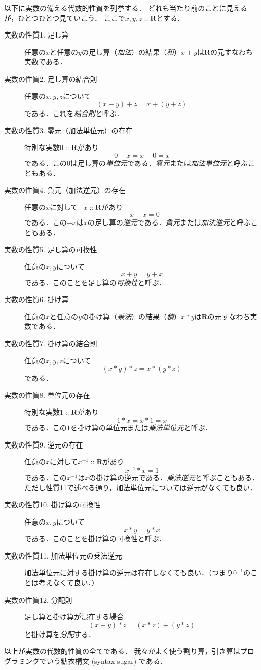 \documentclass[twocolumn]{jsbook}
\DeclareMathOperator{\mathIn}{::}
\newcommand{\mathSet}[1]{\mathbf{#1}}
\newcommand{\keyword}[1]{\emph{#1}}
\begin{document}
以下に実数の備える代数的性質を列挙する．
どれも当たり前のことに見えるが，ひとつひとつ見ていこう．
ここで$x,y,z\mathIn\mathSet{R}$とする．
\begin{description}
\item[実数の性質1. 足し算] 任意の$x$と任意の$y$の足し算（\keyword{加法}）の結果（\keyword{和}）$x+y$は$\mathSet{R}$の元すなわち実数である．
\item[実数の性質2. 足し算の結合則] 任意の$x,y,z$について$$(x+y)+z=x+(y+z)$$である．これを\keyword{結合則}と呼ぶ．
\item[実数の性質3. 零元（加法単位元）の存在] 特別な実数$0\mathIn\mathSet{R}$があり$$0+x=x+0=x$$である．この$0$は足し算の\keyword{単位元}である．\keyword{零元}または\keyword{加法単位元}と呼ぶこともある．
\item[実数の性質4. 負元（加法逆元）の存在] 任意の$x$に対して$-x\mathIn\mathSet{R}$があり$$-x+x=0$$である．この$-x$は$x$の足し算の\keyword{逆元}である．\keyword{負元}または\keyword{加法逆元}と呼ぶこともある．
\item[実数の性質5. 足し算の可換性] 任意の$x,y$について$$x+y=y+x$$である．このことを足し算の\keyword{可換性}と呼ぶ．
\item[実数の性質6. 掛け算] 任意の$x$と任意の$y$の掛け算（\keyword{乗法}）の結果（\keyword{積}）$x*y$は$\mathSet{R}$の元すなわち実数である．
\item[実数の性質7. 掛け算の結合則] 任意の$x,y,z$について$$(x*y)*z=x*(y*z)$$である．
\item[実数の性質8. 単位元の存在] 特別な実数$1\mathIn\mathSet{R}$があり$$1*x=x*1=x$$である．この$1$を掛け算の単位元または\keyword{乗法単位元}と呼ぶ．
\item[実数の性質9. 逆元の存在] 任意の$x$に対して$x^{-1}\mathIn\mathSet{R}$があり$$x^{-1}*x=1$$である．この$x^{-1}$は$x$の掛け算の逆元である．\keyword{乗法逆元}と呼ぶこともある．ただし性質11で述べる通り，加法単位元については逆元がなくても良い．
\item[実数の性質10. 掛け算の可換性] 任意の$x,y$について$$x*y=y*x$$である．このことを掛け算の可換性と呼ぶ．
\item[実数の性質11. 加法単位元の乗法逆元] 加法単位元に対する掛け算の逆元は存在しなくても良い．（つまり$0^{-1}$のことは考えなくて良い．）
\item[実数の性質12. 分配則] 足し算と掛け算が混在する場合$$(x+y)*z=(x*z)+(y*z)$$と掛け算を\keyword{分配}する．
\end{description}
以上が実数の代数的性質の全てである．
我々がよく使う割り算，引き算はプログラミングでいう糖衣構文 (syntax sugar) である．
\end{document}
